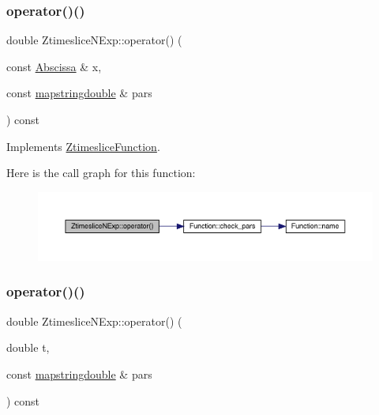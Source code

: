 \subsubsection{\texorpdfstring{operator()()}{operator()()}\hspace{0.1cm}{\footnotesize\ttfamily [2/4]}}
{\footnotesize\ttfamily double Ztimeslice\+N\+Exp\+::operator() (\begin{DoxyParamCaption}\item[{const \mbox{\hyperlink{classAbscissa}{Abscissa}} \&}]{x,  }\item[{const \mbox{\hyperlink{lib_2fitting__lib_2includes_8h_a647b481c557c7966517f753340a81d13}{mapstringdouble}} \&}]{pars }\end{DoxyParamCaption}) const\hspace{0.3cm}{\ttfamily [virtual]}}



Implements \mbox{\hyperlink{classZtimesliceFunction_ae7851ae590054311c69cdafc8f7ed621}{Ztimeslice\+Function}}.

Here is the call graph for this function\+:
\nopagebreak
\begin{figure}[H]
\begin{center}
\leavevmode
\includegraphics[width=350pt]{df/d9d/classZtimesliceNExp_af9ac01b3a80221dd8bf1a0a11cbdbb66_cgraph}
\end{center}
\end{figure}
\mbox{\label{classZtimesliceNExp_a8d550e27c4abc64a0498b224259863b7}} 
\subsubsection{\texorpdfstring{operator()()}{operator()()}\hspace{0.1cm}{\footnotesize\ttfamily [3/4]}}
{\footnotesize\ttfamily double Ztimeslice\+N\+Exp\+::operator() (\begin{DoxyParamCaption}\item[{double}]{t,  }\item[{const \mbox{\hyperlink{lib_2fitting__lib_2includes_8h_a647b481c557c7966517f753340a81d13}{mapstringdouble}} \&}]{pars }\end{DoxyParamCaption}) const\hspace{0.3cm}{\ttfamily [virtual]}}



